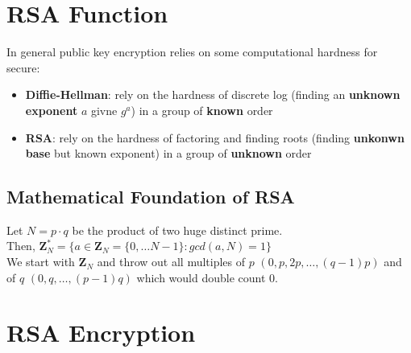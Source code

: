\documentclass{scribe}
\begin{document}
\maketitle


\section{RSA Function}
In general public key encryption relies on some computational hardness for secure:
\begin{itemize}
    \item \textbf{Diffie-Hellman}: rely on the hardness of discrete log (finding an \textbf{unknown exponent} $a$ givne $g^a$) in a group of \textbf{known} order
    \item \textbf{RSA}: rely on the hardness of factoring and finding roots (finding \textbf{unkonwn base} but known exponent) in a group of \textbf{unknown} order
\end{itemize}

\subsection{Mathematical Foundation of RSA}
Let $N = p \cdot q$ be the product of two huge distinct prime.
\\
Then, $\mathbf{Z}_N^* = \{a \in \mathbf{Z}_N = \{0, \dots N-1\}: gcd(a,N) =1\}$
\\
We start with $\mathbf{Z}_N$ and throw out all multiples of $p$ $(0,p,2p, \dots , (q-1)p)$ and of $q$ $(0,q, \dots, (p-1)q)$ which would double count 0. 
\vspace{10mm}

\section{RSA Encryption}

\lipsum



%

\end{document}
